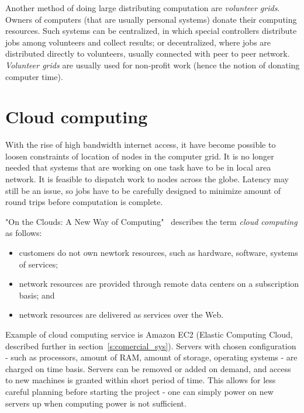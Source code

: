 Another method of doing large distributing computation are \emph{volunteer grids}. Owners of computers (that are usually personal systems) donate their computing resources. Such systems can be centralized, in which special controllers distribute jobs among volunteers and collect results; or decentralized, where jobs are distributed directly to volunteers, usually connected with peer to peer network. \emph{Volunteer grids} are usually used for non-profit work (hence the notion of donating computer time).

\section{Cloud computing}

With the rise of high bandwidth internet access, it have become possible to loosen constraints of location of nodes in the computer grid. It is no longer needed that systems that are working on one task have to be in local area network. It is feasible to dispatch work to nodes across the globe. Latency may still be an issue, so jobs have to be carefully designed to minimize amount of round trips before computation is complete.

\begin{comment}
Han-OnTheClouds-2010.pdf
\end{comment}

"On the Clouds: A New Way of Computing"~\cite{han2013clouds} describes the term \emph{cloud computing} as follows:
\begin{itemize}
\item customers do not own newtork resources, such as hardware, software, systems of services;
\item network resources are provided through remote data centers on a subscription basis; and
\item network resources are delivered as services over the Web.
\end{itemize}

Example of cloud computing service is Amazon EC2 (Elastic Computing Cloud, described further in section~\ref{s:comercial_sys}). Servers with chosen configuration - such as processors, amount of RAM, amount of storage, operating systems - are charged on time basis. Servers can be removed or added on demand, and access to new machines is granted within short period of time. This allows for less careful planning before starting the project - one can simply power on new servers up when computing power is not sufficient.

